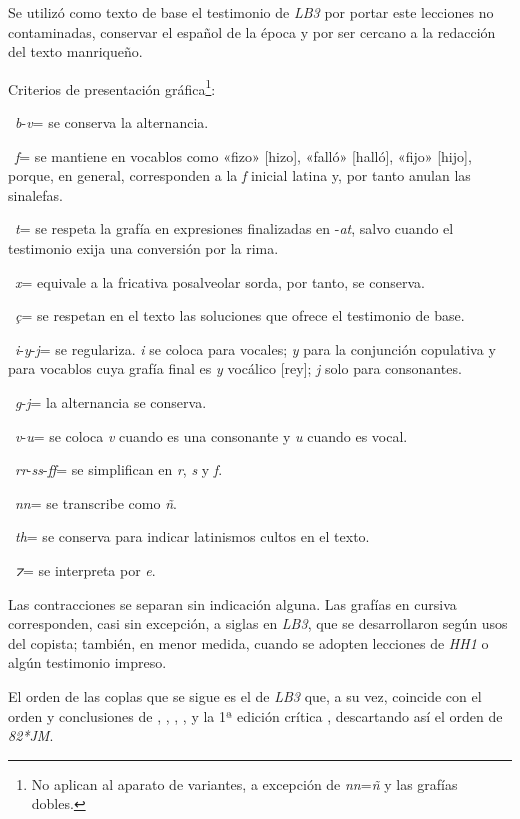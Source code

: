 \documentclass[11pt,a4paper,twoside]{article}
\newcommand{\comillas}[1]{«#1»}
\begin{document}
Se utilizó como texto de base el testimonio de \textit{LB3} por portar este lecciones no contaminadas, conservar el español de la época y por ser cercano a la redacción del texto manriqueño.

Criterios de presentación gráfica\footnote{No aplican al aparato de variantes, a excepción de \textit{nn}=\textit{ñ} y las grafías dobles.}:

~\textit{b}-\textit{v}= se conserva la alternancia.

~\textit{f}= se mantiene en vocablos como \comillas{fizo} [hizo], \comillas{falló} [halló], \comillas{fijo} [hijo], porque, en general, corresponden a la \textit{f} inicial latina y, por tanto anulan las sinalefas.

~\textit{t}= se respeta la grafía en expresiones finalizadas en -\textit{at}, salvo cuando el testimonio exija una conversión por la rima.

~\textit{x}= equivale a la fricativa posalveolar sorda, por tanto, se conserva.

~\textit{ç}= se respetan en el texto las soluciones que ofrece el testimonio de base.

~\textit{i}-\textit{y}-\textit{j}= se regulariza. \textit{i} se coloca para vocales; \textit{y} para la conjunción copulativa y para vocablos cuya grafía final es \textit{y} vocálico [rey]; \textit{j} solo para consonantes.

~\textit{g}-\textit{j}= la alternancia se conserva.

~\textit{v}-\textit{u}= se coloca \textit{v} cuando es una consonante y \textit{u} cuando es vocal.

~\textit{rr}-\textit{ss}-\textit{ff}= se simplifican en \textit{r}, \textit{s} y \textit{f}.

~\textit{nn}= se transcribe como \textit{ñ}.

~\textit{th}= se conserva para indicar latinismos cultos en el texto.

~\textit{⁊}= se interpreta por \textit{e}.

Las contracciones se separan sin indicación alguna. Las grafías en cursiva corresponden, casi sin excepción, a siglas en \textit{LB3}, que se desarrollaron según usos del copista; también, en menor medida, cuando se adopten lecciones de \textit{HH1} o algún testimonio impreso.

El orden de las coplas que se sigue es el de \textit{LB3} que, a su vez, coincide con el orden y conclusiones de \textcite{Senabre1983}, \textcite{Palumbo1983}, \textcite{Orduna1967}, \textcite{Beltrán1991,Beltrán2013}, \textcite{PérezPriego1990,PérezPriego2017} y la 1ª edición crítica \parencite{Foulché-Delbosc1902}, descartando así el orden de \textit{82*JM}.
\end{document}
